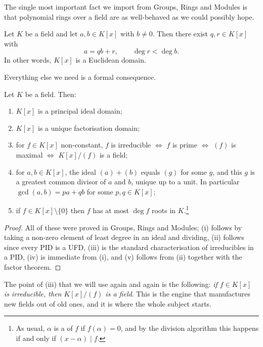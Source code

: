 The single most important fact we import from Groups, Rings and Modules is that polynomial rings over a field are as well-behaved as we could possibly hope.

\begin{theorem}
	Let $K$ be a field and let $a, b \in K[x]$ with $b \neq 0$. Then there exist $q, r \in K[x]$ with
	$$a = qb + r, \qquad \deg r < \deg b.$$
	In other words, $K[x]$ is a Euclidean domain.
\end{theorem}

Everything else we need is a formal consequence.

\begin{corollary}
	Let $K$ be a field. Then:
	\begin{enumerate}[label=(\roman*)]
		\item $K[x]$ is a principal ideal domain;
		\item $K[x]$ is a unique factorisation domain;
		\item for $f \in K[x]$ non-constant, $f$ is irreducible $\iff$ $f$ is prime $\iff$ $(f)$ is maximal $\iff$ $K[x]/(f)$ is a field;
		\item for $a, b \in K[x]$, the ideal $(a) + (b)$ equals $(g)$ for some $g$, and this $g$ is a greatest common divisor of $a$ and $b$, unique up to a unit. In particular $\gcd(a,b) = pa + qb$ for some $p, q \in K[x]$;
		\item if $f \in K[x] \setminus \{0\}$ then $f$ has at most $\deg f$ roots in $K$.\footnote{As usual, $\alpha$ is a  of $f$ if $f(\alpha) = 0$, and by the division algorithm this happens if and only if $(x - \alpha) \mid f$.}
	\end{enumerate}
\end{corollary}

\begin{proof}
	All of these were proved in Groups, Rings and Modules; (i) follows by taking a non-zero element of least degree in an ideal and dividing, (ii) follows since every PID is a UFD, (iii) is the standard characterisation of irreducibles in a PID, (iv) is immediate from (i), and (v) follows from (ii) together with the factor theorem.
\end{proof}

The point of (iii) that we will use again and again is the following: \emph{if $f \in K[x]$ is irreducible, then $K[x]/(f)$ is a field}. This is the engine that manufactures new fields out of old ones, and it is where the whole subject starts.

